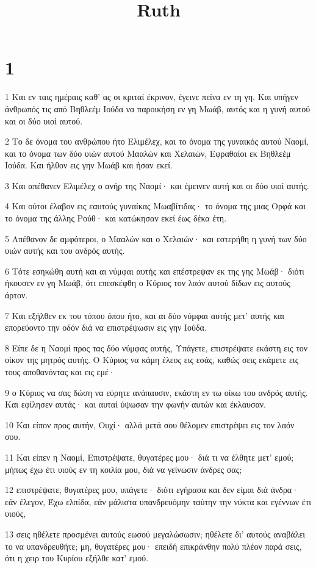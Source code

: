 

\title{Ruth}


\chapter{1}

\par 1 Και εν ταις ημέραις καθ' ας οι κριταί έκρινον, έγεινε πείνα εν τη γη. Και υπήγεν άνθρωπός τις από Βηθλεέμ Ιούδα να παροικήση εν γη Μωάβ, αυτός και η γυνή αυτού και οι δύο υιοί αυτού.
\par 2 Το δε όνομα του ανθρώπου ήτο Ελιμέλεχ, και το όνομα της γυναικός αυτού Ναομί, και το όνομα των δύο υιών αυτού Μααλών και Χελαιών, Εφραθαίοι εκ Βηθλεέμ Ιούδα. Και ήλθον εις γην Μωάβ και ήσαν εκεί.
\par 3 Και απέθανεν Ελιμέλεχ ο ανήρ της Ναομί· και έμεινεν αυτή και οι δύο υιοί αυτής.
\par 4 Και ούτοι έλαβον εις εαυτούς γυναίκας Μωαβίτιδας· το όνομα της μιας Ορφά και το όνομα της άλλης Ρούθ· και κατώκησαν εκεί έως δέκα έτη.
\par 5 Απέθανον δε αμφότεροι, ο Μααλών και ο Χελαιών· και εστερήθη η γυνή των δύο υιών αυτής και του ανδρός αυτής.
\par 6 Τότε εσηκώθη αυτή και αι νύμφαι αυτής και επέστρεψαν εκ της γης Μωάβ· διότι ήκουσεν εν γη Μωάβ, ότι επεσκέφθη ο Κύριος τον λαόν αυτού δίδων εις αυτούς άρτον.
\par 7 Και εξήλθεν εκ του τόπου όπου ήτο, και αι δύο νύμφαι αυτής μετ' αυτής και επορεύοντο την οδόν διά να επιστρέψωσιν εις γην Ιούδα.
\par 8 Είπε δε η Ναομί προς τας δύο νύμφας αυτής, Υπάγετε, επιστρέψατε εκάστη εις τον οίκον της μητρός αυτής. Ο Κύριος να κάμη έλεος εις εσάς, καθώς σεις εκάμετε εις τους αποθανόντας και εις εμέ·
\par 9 ο Κύριος να σας δώση να εύρητε ανάπαυσιν, εκάστη εν τω οίκω του ανδρός αυτής. Και εφίλησεν αυτάς· και αυταί ύψωσαν την φωνήν αυτών και έκλαυσαν.
\par 10 Και είπον προς αυτήν, Ουχί· αλλά μετά σου θέλομεν επιστρέψει εις τον λαόν σου.
\par 11 Και είπεν η Ναομί, Επιστρέψατε, θυγατέρες μου· διά τι να έλθητε μετ' εμού; μήπως έχω έτι υιούς εν τη κοιλία μου, διά να γείνωσιν άνδρες σας;
\par 12 επιστρέψατε, θυγατέρες μου, υπάγετε· διότι εγήρασα και δεν είμαι διά άνδρα· εάν έλεγον, Έχω ελπίδα, εάν μάλιστα υπανδρευόμην ταύτην την νύκτα και εγέννων έτι υιούς,
\par 13 σεις ηθέλετε προσμένει αυτούς εωσού μεγαλώσωσιν; ηθέλετε δι' αυτούς αναβάλει το να υπανδρευθήτε; μη, θυγατέρες μου· επειδή επικράνθην πολύ πλέον παρά σεις, ότι η χειρ του Κυρίου εξήλθε κατ' εμού.
